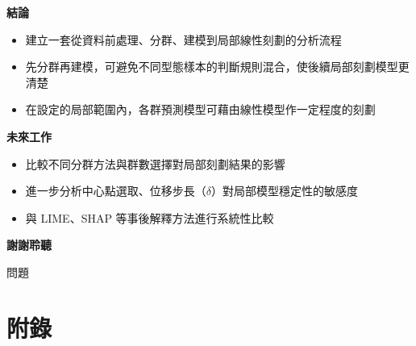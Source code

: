 \documentclass[12pt,aspectratio=43]{beamer}
\begin{document}
\begin{frame}{\textbf{結論}}
  \begin{itemize}
    \item 建立一套從資料前處理、分群、建模到局部線性刻劃的分析流程
    \vspace{1cm}
    \item 先分群再建模，可避免不同型態樣本的判斷規則混合，使後續局部刻劃模型更清楚
    \vspace{1cm}
    \item 在設定的局部範圍內，各群預測模型可藉由線性模型作一定程度的刻劃
  \end{itemize}
\end{frame}

\begin{frame}{\textbf{未來工作}}
  \begin{itemize}
    \item 比較不同分群方法與群數選擇對局部刻劃結果的影響
    \vspace{1cm}
    \item 進一步分析中心點選取、位移步長（$\delta$）對局部模型穩定性的敏感度
    \vspace{1cm}
    \item 與 LIME、SHAP 等事後解釋方法進行系統性比較
  \end{itemize}
\end{frame}

\begin{frame}{\textbf{謝謝聆聽}}
  \begin{center}
  \Huge 問題
  \end{center}
\end{frame}

\section*{附錄}
\end{document}
